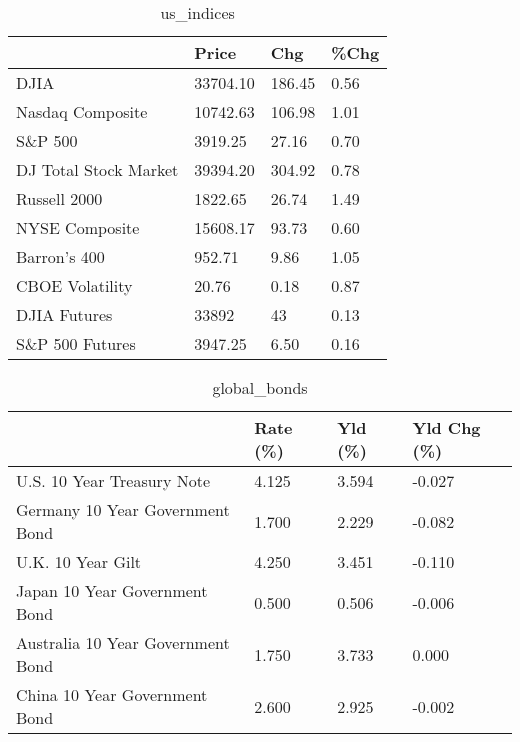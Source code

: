 \documentclass{article}%
\begin{document}
%


\begin{table}[htbp]%
\caption{us\_indices}%
\centering%
\begin{adjustbox}{width=1\textwidth}%
\begin{tabular}{llll}
\toprule
                      &    Price &    Chg & \%Chg \\
\midrule
                 DJIA & 33704.10 & 186.45 & 0.56 \\
     Nasdaq Composite & 10742.63 & 106.98 & 1.01 \\
              S\&P 500 &  3919.25 &  27.16 & 0.70 \\
DJ Total Stock Market & 39394.20 & 304.92 & 0.78 \\
         Russell 2000 &  1822.65 &  26.74 & 1.49 \\
       NYSE Composite & 15608.17 &  93.73 & 0.60 \\
         Barron's 400 &   952.71 &   9.86 & 1.05 \\
      CBOE Volatility &    20.76 &   0.18 & 0.87 \\
         DJIA Futures &    33892 &     43 & 0.13 \\
      S\&P 500 Futures &  3947.25 &   6.50 & 0.16 \\
\bottomrule
\end{tabular}
%
\end{adjustbox}%
\end{table}

%


\begin{table}[htbp]%
\caption{global\_bonds}%
\centering%
\begin{adjustbox}{width=1\textwidth}%
\begin{tabular}{llll}
\toprule
                                  & Rate (\%) & Yld (\%) & Yld Chg (\%) \\
\midrule
       U.S. 10 Year Treasury Note &    4.125 &   3.594 &      -0.027 \\
  Germany 10 Year Government Bond &    1.700 &   2.229 &      -0.082 \\
                U.K. 10 Year Gilt &    4.250 &   3.451 &      -0.110 \\
    Japan 10 Year Government Bond &    0.500 &   0.506 &      -0.006 \\
Australia 10 Year Government Bond &    1.750 &   3.733 &       0.000 \\
    China 10 Year Government Bond &    2.600 &   2.925 &      -0.002 \\
\bottomrule
\end{tabular}
%
\end{adjustbox}%
\end{table}
\end{document}
